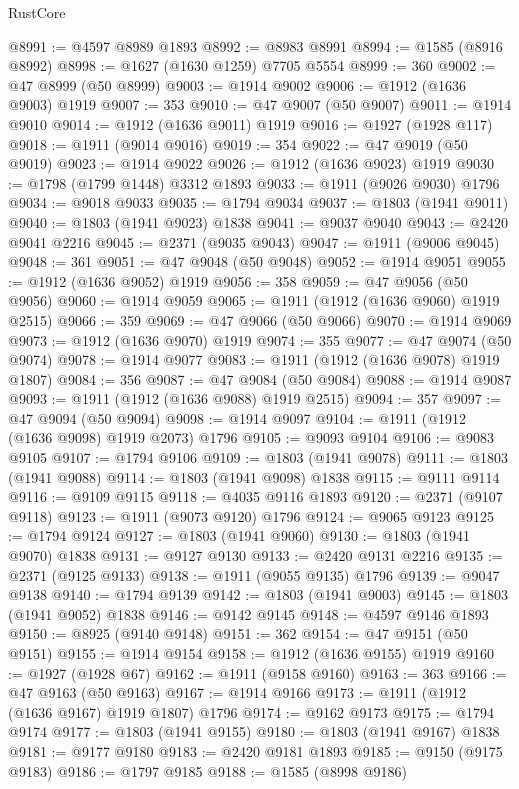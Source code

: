 \begin{lexlean}{RustCore}
\begin{coremodule}
@8991 := @4597 @8989 @1893
@8992 := @8983 @8991
@8994 := @1585 (@8916 @8992)
@8998 := @1627 (@1630 @1259) @7705 @5554
@8999 := 360
@9002 := @47 @8999 (@50 @8999)
@9003 := @1914 @9002
@9006 := @1912 (@1636 @9003) @1919
@9007 := 353
@9010 := @47 @9007 (@50 @9007)
@9011 := @1914 @9010
@9014 := @1912 (@1636 @9011) @1919
@9016 := @1927 (@1928 @117)
@9018 := @1911 (@9014 @9016)
@9019 := 354
@9022 := @47 @9019 (@50 @9019)
@9023 := @1914 @9022
@9026 := @1912 (@1636 @9023) @1919
@9030 := @1798 (@1799 @1448) @3312 @1893
@9033 := @1911 (@9026 @9030) @1796
@9034 := @9018 @9033
@9035 := @1794 @9034
@9037 := @1803 (@1941 @9011)
@9040 := @1803 (@1941 @9023) @1838
@9041 := @9037 @9040
@9043 := @2420 @9041 @2216
@9045 := @2371 (@9035 @9043)
@9047 := @1911 (@9006 @9045)
@9048 := 361
@9051 := @47 @9048 (@50 @9048)
@9052 := @1914 @9051
@9055 := @1912 (@1636 @9052) @1919
@9056 := 358
@9059 := @47 @9056 (@50 @9056)
@9060 := @1914 @9059
@9065 := @1911 (@1912 (@1636 @9060) @1919 @2515)
@9066 := 359
@9069 := @47 @9066 (@50 @9066)
@9070 := @1914 @9069
@9073 := @1912 (@1636 @9070) @1919
@9074 := 355
@9077 := @47 @9074 (@50 @9074)
@9078 := @1914 @9077
@9083 := @1911 (@1912 (@1636 @9078) @1919 @1807)
@9084 := 356
@9087 := @47 @9084 (@50 @9084)
@9088 := @1914 @9087
@9093 := @1911 (@1912 (@1636 @9088) @1919 @2515)
@9094 := 357
@9097 := @47 @9094 (@50 @9094)
@9098 := @1914 @9097
@9104 := @1911 (@1912 (@1636 @9098) @1919 @2073) @1796
@9105 := @9093 @9104
@9106 := @9083 @9105
@9107 := @1794 @9106
@9109 := @1803 (@1941 @9078)
@9111 := @1803 (@1941 @9088)
@9114 := @1803 (@1941 @9098) @1838
@9115 := @9111 @9114
@9116 := @9109 @9115
@9118 := @4035 @9116 @1893
@9120 := @2371 (@9107 @9118)
@9123 := @1911 (@9073 @9120) @1796
@9124 := @9065 @9123
@9125 := @1794 @9124
@9127 := @1803 (@1941 @9060)
@9130 := @1803 (@1941 @9070) @1838
@9131 := @9127 @9130
@9133 := @2420 @9131 @2216
@9135 := @2371 (@9125 @9133)
@9138 := @1911 (@9055 @9135) @1796
@9139 := @9047 @9138
@9140 := @1794 @9139
@9142 := @1803 (@1941 @9003)
@9145 := @1803 (@1941 @9052) @1838
@9146 := @9142 @9145
@9148 := @4597 @9146 @1893
@9150 := @8925 (@9140 @9148)
@9151 := 362
@9154 := @47 @9151 (@50 @9151)
@9155 := @1914 @9154
@9158 := @1912 (@1636 @9155) @1919
@9160 := @1927 (@1928 @67)
@9162 := @1911 (@9158 @9160)
@9163 := 363
@9166 := @47 @9163 (@50 @9163)
@9167 := @1914 @9166
@9173 := @1911 (@1912 (@1636 @9167) @1919 @1807) @1796
@9174 := @9162 @9173
@9175 := @1794 @9174
@9177 := @1803 (@1941 @9155)
@9180 := @1803 (@1941 @9167) @1838
@9181 := @9177 @9180
@9183 := @2420 @9181 @1893
@9185 := @9150 (@9175 @9183)
@9186 := @1797 @9185
@9188 := @1585 (@8998 @9186)

\end{coremodule}
\end{lexlean}
